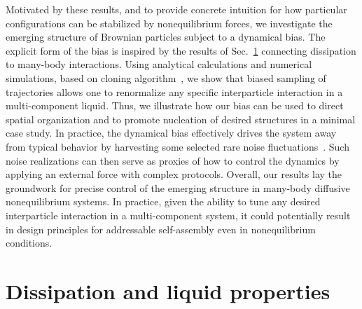 \documentclass[superscriptaddress, twocolumn, prx, longbibliography, nofootinbib]{revtex4-1}
\begin{document}
Motivated by these results, and to provide concrete intuition for how particular configurations can be stabilized by nonequilibrium forces, we investigate the emerging structure of Brownian particles subject to a dynamical bias. The explicit form of the bias is inspired by the results of Sec.~\ref{sec:method} connecting dissipation to many-body interactions. Using analytical calculations and numerical simulations, based on cloning algorithm~\cite{Giadina2006, tailleur2007probing, Hurtado2009, Nemoto2016, Ray2018, Klymko2018, Brewer2018}, we show that biased sampling of trajectories allows one to renormalize any specific interparticle interaction in a multi-component liquid. Thus, we illustrate how our bias can be used to direct spatial organization and to promote nucleation of desired structures in a minimal case study. In practice, the dynamical bias effectively drives the system away from typical behavior by harvesting some selected rare noise fluctuations~\cite{garrahan2007, Hedges2009, Jack2010, Pitard2011, Speck2012, Bodineau2012a, Chetrite2013, Limmer2014, Nemoto2017}. Such noise realizations can then serve as proxies of how to control the dynamics by applying an external force with complex protocols. Overall, our results lay the groundwork for precise control of the emerging structure in many-body diffusive nonequilibrium systems. In practice, given the ability to tune any desired interparticle interaction in a multi-component system, it could potentially result in design principles for addressable self-assembly even in nonequilibrium conditions.
 



\section{Dissipation and liquid properties}\label{sec:method}
\end{document}
